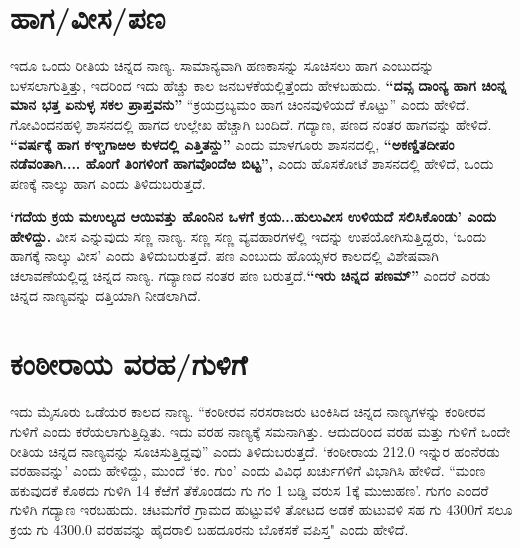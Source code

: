 \section*{ಹಾಗ/ವೀಸ/ಪಣ}

ಇದೂ ಒಂದು ರೀತಿಯ ಚಿನ್ನದ ನಾಣ್ಯ. ಸಾಮಾನ್ಯವಾಗಿ ಹಣಕಾಸನ್ನು ಸೂಚಿಸಲು ಹಾಗ ಎಂಬುದನ್ನು ಬಳಸಲಾಗುತ್ತಿತ್ತು, ಇದರಿಂದ ಇದು ಹೆಚ್ಚು ಕಾಲ ಜನಬಳಕೆಯಲ್ಲಿತ್ತೆಂದು ಹೇಳಬಹುದು. \textbf{“ದವ್ಸ ದಾಂನ್ಯ ಹಾಗ ಚಿಂನ್ನ ಮಾನ ಭತ್ತ ಏನುಳ್ಳ ಸಕಲ ಪ್ರಾಪ್ತವನು”} “ಕ್ರಯದ್ರಬ್ಯಮಂ ಹಾಗ ಚಿಂನವುಳಿಯದೆ ಕೊಟ್ಟು” ಎಂದು ಹೇಳಿದೆ. ಗೋವಿಂದನಹಳ್ಳಿ ಶಾಸನದಲ್ಲಿ ಹಾಗದ ಉಲ್ಲೇಖ ಹೆಚ್ಚಾಗಿ ಬಂದಿದೆ. ಗದ್ಯಾಣ, ಪಣದ ನಂತರ ಹಾಗವನ್ನು ಹೇಳಿದೆ. \textbf{“ವರ್ಷಕ್ಕೆ ಹಾಗ ಕಞ್ಚಗಾಱಅ ಕುಳದಲ್ಲಿ ಎತ್ತಿತನ್ದು”} ಎಂದು ಮಾಳಗೂರು ಶಾಸನದಲ್ಲಿ, \textbf{“ಅಕಣ್ಡಿತದೀಪಂ ನಡೆವಂತಾಗಿ.... ಹೊಂಗೆ ತಿಂಗಳಿಂಗೆ ಹಾಗವೊಂದೆಱ ಬಿಟ್ಟ”, }ಎಂದು ಹೊಸಕೋಟೆ ಶಾಸನದಲ್ಲಿ ಹೇಳಿದೆ, ಒಂದು ಪಣಕ್ಕೆ ನಾಲ್ಕು ಹಾಗ ಎಂದು ತಿಳಿದುಬರುತ್ತದೆ.

\textbf{‘ಗದೆಯ ಕ್ರಯ ಮಉಲ್ಯದ ಆಯಿವತ್ತು ಹೊಂನಿನ ಒಳಗೆ ಕ್ರಯ...ಹುಲುವೀಸ ಉಳಿಯದೆ ಸಲಿಸಿಕೊಂಡು’ ಎಂದು ಹೇಳಿದ್ದು.} ವೀಸ ಎನ್ನುವುದು ಸಣ್ಣ ನಾಣ್ಯ. ಸಣ್ಣ ಸಣ್ಣ ವ್ಯವಹಾರಗಳಲ್ಲಿ ಇದನ್ನು ಉಪಯೋಗಿಸುತ್ತಿದ್ದರು, ‘ಒಂದು ಹಾಗಕ್ಕೆ ನಾಲ್ಕು ವೀಸ’ ಎಂದು ತಿಳಿದುಬರುತ್ತದೆ. ಪಣ ಎಂಬುದು ಹೊಯ್ಸಳರ ಕಾಲದಲ್ಲಿ ವಿಶೇಷವಾಗಿ ಚಲಾವಣೆಯಲ್ಲಿದ್ದ ಚಿನ್ನದ ನಾಣ್ಯ. ಗದ್ಯಾಣದ ನಂತರ ಪಣ ಬರುತ್ತದೆ.\textbf{“ಇರು ಚಿನ್ನದ ಪಣಮ್”} ಎಂದರೆ ಎರಡು ಚಿನ್ನದ ನಾಣ್ಯವನ್ನು ದತ್ತಿಯಾಗಿ ನೀಡಲಾಗಿದೆ.

\section*{ಕಂಠೀರಾಯ ವರಹ/ಗುಳಿಗೆ}

ಇದು ಮೈಸೂರು ಒಡೆಯರ ಕಾಲದ ನಾಣ್ಯ. “ಕಂಠೀರವ ನರಸರಾಜರು ಟಂಕಿಸಿದ ಚಿನ್ನದ ನಾಣ್ಯಗಳನ್ನು ಕಂಠೀರವ ಗುಳಿಗೆ ಎಂದು ಕರೆಯಲಾಗುತ್ತಿದ್ದಿತು. ಇದು ವರಹ ನಾಣ್ಯಕ್ಕೆ ಸಮನಾಗಿತ್ತು. ಆದುದರಿಂದ ವರಹ ಮತ್ತು ಗುಳಿಗೆ ಒಂದೇ ರೀತಿಯ ಚಿನ್ನದ ನಾಣ್ಯವನ್ನು ಸೂಚಿಸುತ್ತಿದ್ದವು” ಎಂದು ತಿಳಿದುಬರುತ್ತದೆ. ‘ಕಂಠೀರಾಯ 212.0 ಇನ್ನುರ ಹಂನೆರಡು ವರಹಾವನ್ನು’ ಎಂದು ಹೇಳಿದ್ದು, ಮುಂದೆ ‘ಕಂ. ಗುಂ’ ಎಂದು ವಿವಿಧ ಖರ್ಚುಗಳಿಗೆ ವಿಭಾಗಿಸಿ ಹೇಳಿದೆ. “ಮಂಣ ಹಕುವುದಕೆ ಕೊಠದು ಗುಳಿಗಿ 14 ಕೆಱೆಗೆ ತೆಕೊಂಡದು ಗು ಗಂ 1 ಬಡ್ಡಿ ವರುಸ 1ಕ್ಕೆ ಮುಱುಹಣ’. ಗುಗಂ ಎಂದರೆ ಗುಳಿಗಿ ಗದ್ಯಾಣ ಇರಬಹುದು. ಚಟಮಗೆರೆ ಗ್ರಾಮದ ಹುಟ್ಟುವಳಿ ತೋಟದ ಅಡಕೆ ಹುಟುವಳಿ ಸಹ ಗು 4300ಗೆ ಸಲೂ ಕ್ರಯ ಗು 4300.0 ವರಹವನ್ನು ಹೈದರಾಲಿ ಬಹದೂರನು ಬೊಕಸಕೆ ವಪಿಸ್ತ" ಎಂದು ಹೇಳಿದೆ.

